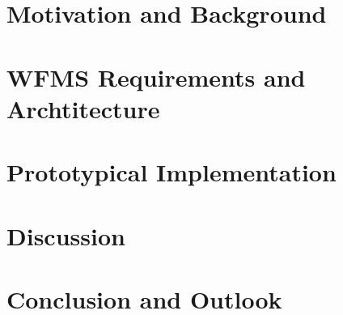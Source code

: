 \documentclass[language=english,noinputenc]{wiwwuwordrprt}
\begin{document}
  \section{Motivation and Background} %
  \label{sec:motivation}


  \newpage
  \section{WFMS Requirements and Archtitecture} %
  \label{sec:wfms_requirements_and_archtitecture}


  \newpage
  \section{Prototypical Implementation} %
  \label{sec:prototypical_implementation}


  \newpage
  \section{Discussion} %
  \label{sec:discussion}


  \newpage
  \section{Conclusion and Outlook} %
  \label{sec:conclusion}

\end{document}
